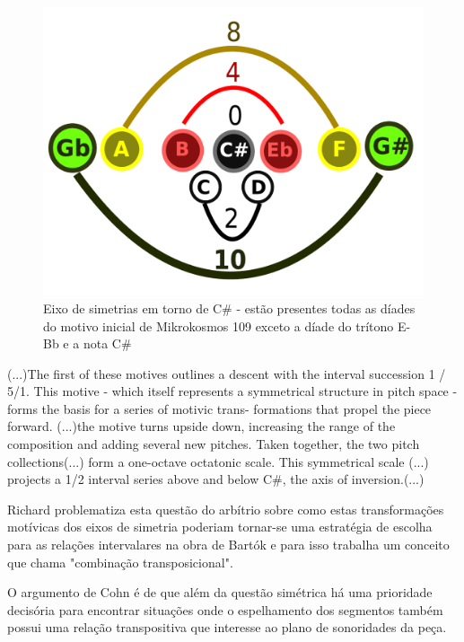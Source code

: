 \documentclass[
	12pt,				%
	openright,			%
	twoside,			%
	a4paper,			%
	english,			%
	french,				%
	spanish,			%
	brazil				%
	]{abntex2}
\begin{document}
\begin{figure}[!h]
	\caption{\label{fig_grafico}Eixo de simetrias em torno de C\# - estão presentes todas as díades do motivo inicial de Mikrokosmos 109 exceto a díade do trítono E-Bb e a nota C\#}
	\begin{center}
	    \includegraphics[scale=0.4]{axis/simetriamikro109.pdf}
	\end{center}
\end{figure}


\begin{citacao}
(...)The first of these motives outlines a descent with the interval
succession 1 / 5/1. This motive - which itself represents a symmetrical
structure in pitch space - forms the basis for a series of motivic trans-
formations that propel the piece forward. (...)the motive turns
upside down, increasing the range of the composition and adding
several new pitches. Taken together, the two pitch collections(...)
form a one-octave octatonic scale. This symmetrical scale (...)
projects a 1/2 interval series above and below C\#, the axis of
inversion.(...)
\cite{pearsall2004symmetry}
\end{citacao}

Richard  problematiza esta questão do arbítrio sobre como estas transformações motívicas dos eixos de simetria poderiam tornar-se uma estratégia de escolha para as relações intervalares na obra de Bartók e para isso trabalha um conceito que chama "combinação transposicional". 

O argumento de Cohn é de que além da questão simétrica há uma prioridade decisória para encontrar situações onde o espelhamento dos segmentos também possui uma relação transpositiva que interesse ao plano de sonoridades da peça.
\end{document}
